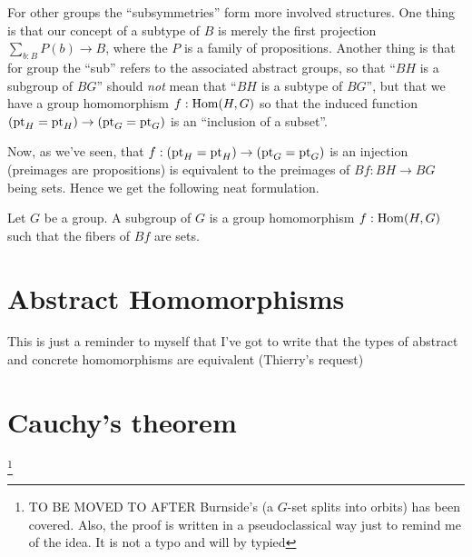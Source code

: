 For other groups the ``subsymmetries'' form more involved structures.  One thing is that our concept of a subtype of $B$ is merely the first projection $\sum_{b:B}P(b)\to B$, where the $P$ is a family of propositions.  Another thing is that for group the ``sub'' refers to the associated abstract groups, so that ``$BH$ is a subgroup of $BG$'' should \emph{not} mean that ``$BH$ is a subtype of $BG$'', but that we have a group homomorphism $f:\mathrm{Hom}(H,G)$ so that the induced function $({\mathord{\mathrm{pt}}}_H={\mathord{\mathrm{pt}}}_H)\to({\mathord{\mathrm{pt}}}_G={\mathord{\mathrm{pt}}}_G)$ is an ``inclusion of a subset''. 

Now, as we've seen, that   $f:({\mathord{\mathrm{pt}}}_H={\mathord{\mathrm{pt}}}_H)\to({\mathord{\mathrm{pt}}}_G={\mathord{\mathrm{pt}}}_G)$ is an injection (preimages are propositions) is equivalent to the preimages of $Bf:BH\to BG$ being sets.  Hence we get the following neat formulation.

    \begin{definition}
      \label{def:subgroup}
      Let $G$ be a group.  A subgroup of $G$ is a group homomorphism $f:\mathrm{Hom}(H,G)$ such that the fibers of $Bf$ are sets.
    \end{definition}

\section{Abstract Homomorphisms}
\label{sec:abshom}

{\color{red}This is just a reminder to myself that I've got to write that the types of abstract and concrete homomorphisms are equivalent (Thierry's request)}
\section{Cauchy's theorem}
\footnote{TO BE MOVED TO AFTER Burnside's (\ie a $G$-set splits into orbits) has been covered.  Also, the proof is written in a pseudoclassical way just to remind me of the idea.  It is not a typo and will by typied}

